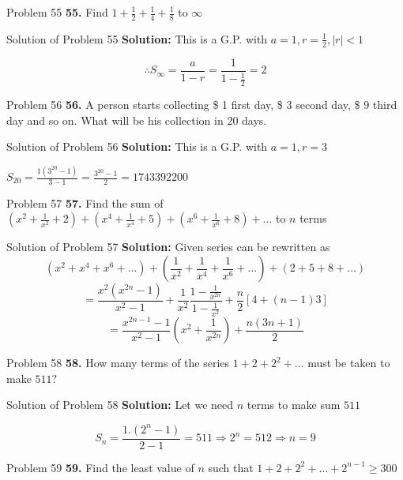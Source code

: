 \documentclass[aspectratio=1610,8pt]{beamer}
\begin{document}
\begin{frame}{Problem 55}
  \textbf{55.} Find $1 + \frac{1}{2} + \frac{1}{4} + \frac{1}{8}$ to $\infty$
\end{frame}
\begin{frame}{Solution of Problem 55}
  \textbf{Solution:} This is a G.P. with $a = 1, r = \frac{1}{2}, |r| < 1$

  $$\therefore S_{\infty} = \frac{a}{1 - r} = \frac{1}{1 - \frac{1}{2}} = 2$$
\end{frame}
\begin{frame}{Problem 56}
  \textbf{56.} A person starts collecting \$ 1 first day, \$ 3 second day, \$ 9 third day and so on. What will be his collection in
  $20$ days.
\end{frame}
\begin{frame}{Solution of Problem 56}
  \textbf{Solution:} This is a G.P. with $a = 1, r = 3$

  $S_{20} = \frac{1(3^{20} - 1)}{3 - 1} = \frac{3^{20} - 1}{2} = 1743392200$
\end{frame}
\begin{frame}{Problem 57}
  \textbf{57.} Find the sum of $\left(x^2 + \frac{1}{x^2} + 2\right) + \left(x^4 + \frac{1}{x^4} + 5\right) + \left(x^6 +
  \frac{1}{x^6} + 8\right) + \ldots$ to $n$ terms
\end{frame}
\begin{frame}{Solution of Problem 57}
  \textbf{Solution:} Given series can be rewritten as
  $$(x^2 + x^4 + x^6 + \ldots) + \left(\frac{1}{x^2} + \frac{1}{x^4} + \frac{1}{x^6} + \ldots\right) + (2 + 5 + 8 + \ldots)$$
  $$= \frac{x^2(x^{2n} - 1)}{x^2 - 1} + \frac{1}{x^2}\frac{1 - \frac{1}{x^{2n}}}{1 - \frac{1}{x^2}} + \frac{n}{2}[4 + (n - 1)3]$$
  $$= \frac{x^{2n - 1} - 1}{x^2 - 1}\left(x^2 + \frac{1}{x^{2n}}\right) + \frac{n(3n + 1)}{2}$$
\end{frame}
\begin{frame}{Problem 58}
  \textbf{58.} How many terms of the series $1 + 2 + 2^2 + \ldots$ must be taken to make $511?$
\end{frame}
\begin{frame}{Solution of Problem 58}
  \textbf{Solution:} Let we need $n$ terms to make sum $511$

  $$S_n = \frac{1.(2^n - 1)}{2 - 1} = 511\Rightarrow 2^n = 512\Rightarrow n = 9$$
\end{frame}
\begin{frame}{Problem 59}
  \textbf{59.} Find the least value of $n$ such that $1 + 2 + 2^2 + \ldots + 2^{n - 1} \geq 300$
\end{frame}
\end{document}
